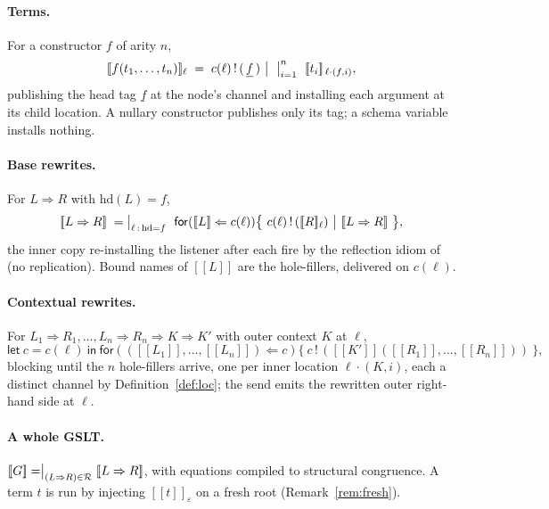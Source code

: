 \documentclass[11pt]{article}
\newcommand{\sem}[1]{[\![#1]\!]}
\newcommand{\for}[2]{\mathsf{for}(#1 \Leftarrow #2)}
\newcommand{\out}[2]{#1\,!\,(#2)}
\theoremstyle{plain}
\theoremstyle{definition}
\theoremstyle{remark}
\begin{document}
\paragraph{Terms.} For a constructor $f$ of arity $n$,
\[
\sem{f(t_1,\dots,t_n)}_\ell
\;=\;
\out{c(\ell)}{\,\underline{f}\,}
\ \big|\
\textstyle\bigm|_{i=1}^{n}\ \sem{t_i}_{\,\ell\cdot(f,i)},
\]
publishing the head tag $\underline f$ at the node's channel and installing each argument at its child
location. A nullary constructor publishes only its tag; a schema variable installs nothing.

\paragraph{Base rewrites.} For $L\Rightarrow R$ with $\mathrm{hd}(L)=f$,
\[
\sem{L\Rightarrow R}
\;=\;
\textstyle\bigm|_{\ell\,:\,\mathrm{hd}=f}\
\for{\sem{L}}{c(\ell)}\bigl\{\ \out{c(\ell)}{\sem{R}_\ell}\ \big|\ \sem{L\Rightarrow R}\ \bigr\},
\]
the inner copy re-installing the listener after each fire by the reflection idiom
of~\cite[\S2.1]{knotrho} (no replication). Bound names of $\sem{L}$ are the hole-fillers, delivered on
$c(\ell)$.

\paragraph{Contextual rewrites.} For
$L_1\Rightarrow R_1,\dots,L_n\Rightarrow R_n\Rightarrow K\Rightarrow K'$ with outer context $K$ at
$\ell$,
\[
\mathsf{let}\ c=c(\ell)\ \mathsf{in}\
\for{(\sem{L_1},\dots,\sem{L_n})}{c}\bigl\{\ \out{c}{\sem{K'}(\sem{R_1},\dots,\sem{R_n})}\ \bigr\},
\]
blocking until the $n$ hole-fillers arrive, one per inner location $\ell\cdot(K,i)$, each a distinct
channel by Definition~\ref{def:loc}; the send emits the rewritten outer right-hand side at $\ell$.

\paragraph{A whole GSLT.} $\sem{G}=\bigm|_{(L\Rightarrow R)\in\mathcal R}\sem{L\Rightarrow R}$, with
equations compiled to structural congruence. A term $t$ is run by injecting $\sem{t}_\varepsilon$ on a
fresh root (Remark~\ref{rem:fresh}).
\end{document}
